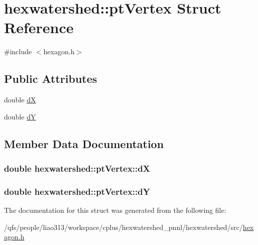\hypertarget{structhexwatershed_1_1ptVertex}{\section{hexwatershed\-:\-:pt\-Vertex Struct Reference}
\label{structhexwatershed_1_1ptVertex}
}


{\ttfamily \#include $<$hexagon.\-h$>$}

\subsection*{Public Attributes}
\begin{DoxyCompactItemize}
\item 
double \hyperlink{structhexwatershed_1_1ptVertex_aee0ff8dfba2b22b27fba81d249e828aa}{d\-X}
\item 
double \hyperlink{structhexwatershed_1_1ptVertex_acd4e11033877bae01f92d06efb906add}{d\-Y}
\end{DoxyCompactItemize}


\subsection{Member Data Documentation}
\hypertarget{structhexwatershed_1_1ptVertex_aee0ff8dfba2b22b27fba81d249e828aa}{
\subsubsection[{d\-X}]{\setlength{\rightskip}{0pt plus 5cm}double hexwatershed\-::pt\-Vertex\-::d\-X}}\label{structhexwatershed_1_1ptVertex_aee0ff8dfba2b22b27fba81d249e828aa}
\hypertarget{structhexwatershed_1_1ptVertex_acd4e11033877bae01f92d06efb906add}{
\subsubsection[{d\-Y}]{\setlength{\rightskip}{0pt plus 5cm}double hexwatershed\-::pt\-Vertex\-::d\-Y}}\label{structhexwatershed_1_1ptVertex_acd4e11033877bae01f92d06efb906add}


The documentation for this struct was generated from the following file\-:\begin{DoxyCompactItemize}
\item 
/qfs/people/liao313/workspace/cplus/hexwatershed\-\_\-pnnl/hexwatershed/src/\hyperlink{hexagon_8h}{hexagon.\-h}\end{DoxyCompactItemize}
